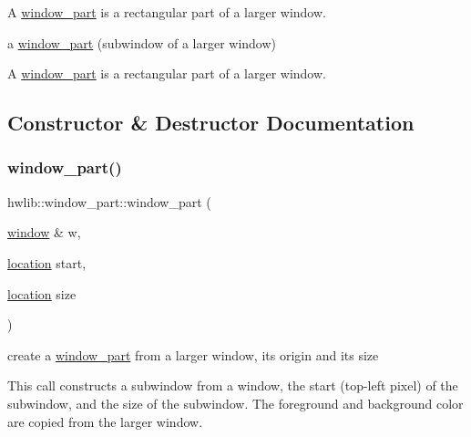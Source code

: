 A \hyperlink{classhwlib_1_1window__part}{window\+\_\+part} is a rectangular part of a larger window.

a \hyperlink{classhwlib_1_1window__part}{window\+\_\+part} (subwindow of a larger window)

A \hyperlink{classhwlib_1_1window__part}{window\+\_\+part} is a rectangular part of a larger window. 

\subsection{Constructor \& Destructor Documentation}
\mbox{\label{classhwlib_1_1window__part_a61d5cdec717d38ea7e013259b6c68ab9}} 
\subsubsection{\texorpdfstring{window\+\_\+part()}{window\_part()}\hspace{0.1cm}{\footnotesize\ttfamily [1/2]}}
{\footnotesize\ttfamily hwlib\+::window\+\_\+part\+::window\+\_\+part (\begin{DoxyParamCaption}\item[{\hyperlink{classhwlib_1_1window}{window} \&}]{w,  }\item[{\hyperlink{classhwlib_1_1location}{location}}]{start,  }\item[{\hyperlink{classhwlib_1_1location}{location}}]{size }\end{DoxyParamCaption})\hspace{0.3cm}{\ttfamily [inline]}}



create a \hyperlink{classhwlib_1_1window__part}{window\+\_\+part} from a larger window, its origin and its size 

This call constructs a subwindow from a window, the start (top-\/left pixel) of the subwindow, and the size of the subwindow. The foreground and background color are copied from the larger window. \mbox{\label{classhwlib_1_1window__part_afd762274f11c9efaefc0faaebb271da4}} 
